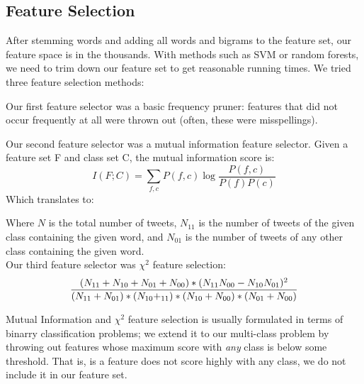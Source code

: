 \documentclass[fontsize=10pt,twocolumn,letterpaper,abstracton]{scrartcl}
\begin{document}

\subsection{Feature Selection}
After stemming words and adding all words and bigrams to the feature set, our feature space is in the thousands.  With methods such as SVM or random forests, we need to trim down our feature set to get reasonable running times. We tried three feature selection methods:

Our first feature selector was a basic frequency pruner: features that did not occur frequently at all were thrown out (often, these were misspellings). %

Our second feature selector was a mutual information feature selector.  Given a feature set F and class set C, the mutual information score is:\\
\begin{equation}
I(F;C) = \sum_{f,c} P(f,c)\log\frac{P(f,c)}{P(f)P(c)}
\end{equation}
Which translates to:\\

{ 
}

Where $N$ is the total number of tweets, $N_{11}$ is the number of tweets of the given class containing the given word, and $N_{01}$ is the number of tweets of any other class containing the given word.\\
Our third feature selector was $\chi^{2}$ feature selection:\\
\small
\begin{multline}
\centering
\frac{(N_{11}+ N_{10} + N_{01} + N_{00}) * (N_{11}N_{00} - N_{10}N_{01})^{2}}{(N_{11} + N_{01}) * (N_{10} + _{11}) *
(N_{10} + N_{00}) * (N_{01} + N_{00})}
\end{multline}
\normalsize

Mutual Information and $\chi^{2}$ feature selection is usually formulated in terms of binarry classification problems; we extend it to our multi-class problem by throwing out features whose maximum score with \emph{any} class is below some threshold.  That is, is a feature does not score highly with any class, we do not include it in our feature set.
\end{document}
